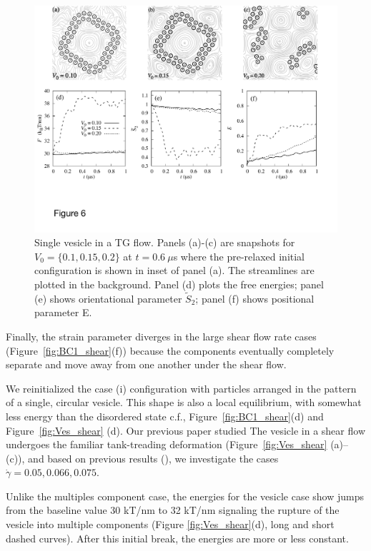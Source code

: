 \documentclass[aps,prl,preprint,groupedaddress]{revtex4-2}
\begin{document}
\begin{figure}
  \begin{center}
    \includegraphics[width=1.0\textwidth]{Figures/Figure6.pdf}        
  \end{center}
\caption{\label{fig:ves_TG} Single vesicle in a TG flow. Panels (a)-(c) are snapshots for $V_0=\{0.1, 0.15, 0.2\}$ at $t=0.6\ \mu$s where the pre-relaxed initial configuration is shown in inset of panel (a). The streamlines are plotted in the background.
Panel (d) plots the free energies; panel (e) shows orientational parameter $\tilde{S}_2$; panel (f) shows positional parameter E.
}
\end{figure}


Finally, the strain parameter diverges in the large shear flow rate cases (Figure~\ref{fig:BC1_shear}(f))
because the components eventually completely separate and move away from one another
under the shear flow.

We reinitialized the case (i) configuration with particles arranged in the pattern of a single, circular vesicle.
This shape is also a local equilibrium, with somewhat less energy than the disordered state c.f.,
Figure~\ref{fig:BC1_shear}(d) and Figure~\ref{fig:Ves_shear} (d).
Our previous paper \cite{Fu2022_JFM} studied
The vesicle in a shear flow undergoes the familiar tank-treading deformation (Figure~\ref{fig:Ves_shear} (a)--(c)),
and based on previous results (\cite{Fu2022_JFM}),
we investigate the cases $\dot\gamma=0.05, 0.066, 0.075$.

Unlike the multiples component case, 
the energies for the vesicle case show jumps from the baseline value $30$ kT/nm to 32 kT/nm
signaling the rupture of the vesicle into multiple components
(Figure \ref{fig:Ves_shear}(d), long and short dashed curves).
After this initial break, the energies are more or less constant.
\end{document}
